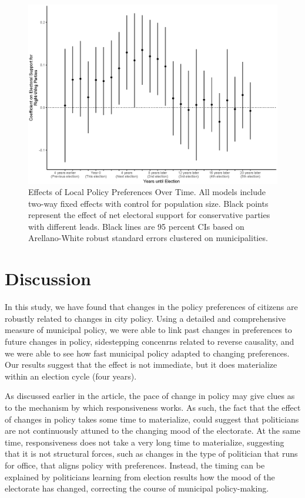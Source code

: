 \documentclass[a4paper,12pt]{article}
\begin{document}
\begin{figure}[htbp]
	\centering
	\includegraphics[scale = .65]{dynamics.eps}
	\caption{Effects of Local Policy Preferences Over Time. All models include two-way fixed effects with control for population size. Black points represent the effect of net electoral support for conservative parties with different leads. Black lines are 95 percent CIs based on Arellano-White robust standard errors clustered on municipalities. }
	\label{fig:LongRun}
\end{figure}




\section*{Discussion}

In this study, we have found that changes in the policy preferences of citizens are robustly related to changes in city policy.  Using a detailed and comprehensive measure of municipal policy, we were able to link past changes in preferences to future changes in policy, sidestepping concenrns related to reverse causality, and we were able to see how fast municipal policy adapted to changing preferences. Our results suggest that the effect is not immediate, but it does materialize within an election cycle (four years).

As discussed earlier in the article, the pace of change in policy may give clues as to the mechanism by which responsiveness works. As such, the fact that the effect of changes in policy takes some time to materialize, could suggest that politicians are not continuously  attuned to the changing mood of the electorate. At the same time, responsiveness does not take a very long time to materialize, suggesting that it is not structural forces, such as changes in the type of politician that runs for office, that aligns policy with preferences. Instead, the timing can be explained by politicians learning from election results how the mood of the electorate has changed, correcting the course of municipal policy-making. 
\end{document}
